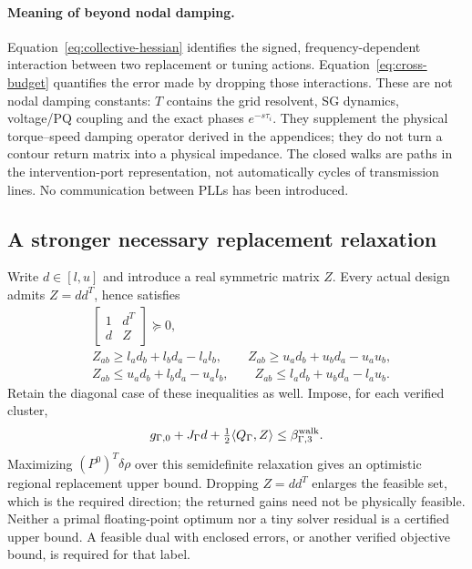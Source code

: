 \documentclass[11pt]{article}
\begin{document}
\paragraph{Meaning of beyond nodal damping.}
Equation~\eqref{eq:collective-hessian} identifies the signed,
frequency-dependent interaction between two replacement or tuning
actions. Equation~\eqref{eq:cross-budget} quantifies the error made
by dropping those interactions. These are not nodal damping
constants: $T$ contains the grid resolvent, SG dynamics, voltage/PQ
coupling and the exact phases $e^{-s\tau_i}$. They supplement the
physical torque--speed damping operator derived in the appendices;
they do not turn a contour return matrix into a physical impedance.
The closed walks are paths in the intervention-port representation,
not automatically cycles of transmission lines. No communication
between PLLs has been introduced.

\subsection{A stronger necessary replacement relaxation}
Write $d\in[l,u]$ and introduce a real symmetric matrix $Z$.
Every actual design admits $Z=dd^T$, hence satisfies
\begin{align}
 &\begin{bmatrix}1&d^T\\d&Z\end{bmatrix}\succeq0,\\
 &Z_{ab}\ge l_ad_b+l_bd_a-l_al_b,\qquad
 Z_{ab}\ge u_ad_b+u_bd_a-u_au_b,\\
 &Z_{ab}\le u_ad_b+l_bd_a-u_al_b,\qquad
 Z_{ab}\le l_ad_b+u_bd_a-l_au_b .
\end{align}
Retain the diagonal case of these inequalities as well.
Impose, for each verified cluster,
\begin{equation}
 g_{\Gamma,0}+J_\Gamma d+
       \tfrac12\langle Q_\Gamma,Z\rangle
       \le\beta_{\Gamma,3}^{\rm walk}.
 \label{eq:quadratic-outer}
\end{equation}
Maximizing $(P^0)^T\delta\rho$ over this semidefinite relaxation gives
an optimistic regional replacement upper bound. Dropping
$Z=dd^T$ enlarges the feasible set, which is the required direction;
the returned gains need not be physically feasible.
Neither a primal floating-point optimum nor a tiny solver residual
is a certified upper bound. A feasible dual with enclosed errors,
or another verified objective bound, is required for that label.
\end{document}
